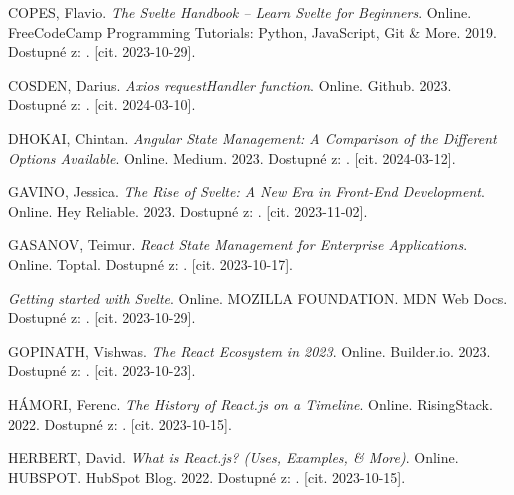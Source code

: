 \begin{thebibliography}{99}
\textsc{COPES}, Flavio. \emph{The Svelte Handbook -- Learn Svelte for Beginners}. Online. FreeCodeCamp Programming Tutorials: Python, JavaScript, Git \& More. 2019. Dostupné z: . [cit. 2023-10-29].

\textsc{COSDEN}, Darius. \emph{Axios requestHandler function}. Online. Github. 2023. Dostupné z: . [cit. 2024-03-10].

\textsc{DHOKAI}, Chintan. \emph{Angular State Management: A Comparison of the Different Options Available}. Online. Medium. 2023. Dostupné z: . [cit. 2024-03-12].

\textsc{GAVINO}, Jessica. \emph{The Rise of Svelte: A New Era in Front-End Development}. Online. Hey Reliable. 2023. Dostupné z: . [cit. 2023-11-02].

\textsc{GASANOV}, Teimur. \emph{React State Management for Enterprise Applications}. Online. Toptal. Dostupné z: . [cit. 2023-10-17].

\emph{Getting started with Svelte}. Online. MOZILLA FOUNDATION. MDN Web Docs. Dostupné z: . [cit. 2023-10-29].

\textsc{GOPINATH}, Vishwas. \emph{The React Ecosystem in 2023}. Online. Builder.io. 2023. Dostupné z: . [cit. 2023-10-23].

\textsc{HÁMORI}, Ferenc. \emph{The History of React.js on a Timeline}. Online. RisingStack. 2022. Dostupné z: . [cit. 2023-10-15].

\textsc{HERBERT}, David. \emph{What is React.js? (Uses, Examples, \& More)}. Online. HUBSPOT. HubSpot Blog. 2022. Dostupné z: . [cit. 2023-10-15].


\end{thebibliography}
